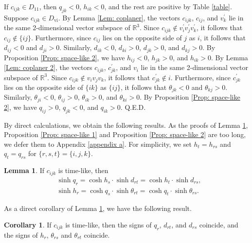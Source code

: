 \documentclass[12pt]{amsart}
\theoremstyle{definition}
\newtheorem{lemma}[theorem]{Lemma}
\newtheorem{corollary}[theorem]{Corollary}
\def\qed{\hfill{Q.E.D.}\smallskip}
\begin{document}
If $c_{ijk}\in D_{11}$, then $q_{jk}<0$, $h_{ik}<0$, and the rest are positive by Table \ref{table}.
Suppose $c_{ijk}\in D_{\mathrm{vi}}$.
By Lemma \ref{Lem: coplaner}, the vectors $c_{ijk}$, $c_{ij}$, and $v^\prime_k$ lie in the same 2-dimensional vector subspace of $\mathbb{R}^3$.
Since $c_{ijk}\notin v^\prime_iv^\prime_jv^\prime_k$,
it follows that $c_{ij}\notin \{ij\}$.
Furthermore, since $c_{ij}$ lies on the opposite side of $j$ as $i$, it follows that $d_{ij}<0$ and $d_{ji}>0$.
Similarly, $d_{ik}<0$, $d_{ki}>0$, $d_{jk}>0$, and $d_{kj}>0$.
By Proposition \ref{Prop: space-like 2},
we have $h_{ij}<0$, $h_{jk}>0$, and $h_{ik}>0$.
By Lemma \ref{Lem: coplaner 2},
the vectors $c_{ijk}$, $c^\prime_{jk}$, and $v_i$ lie in the same 2-dimensional vector subspace of $\mathbb{R}^3$.
Since $c_{ijk}\notin v_iv_jv_k$, it follows that $c^\prime_{jk}\notin i$.
Furthermore, since $c^\prime_{jk}$ lies on the opposite side of $\{ik\}$ as $\{ij\}$, it follows that $\theta_{jk}<0$ and $\theta_{kj}>0$.
Similarly, $\theta_{ji}<0$, $\theta_{ij}>0$, $\theta_{ik}>0$, and $\theta_{ki}>0$.
By Proposition \ref{Prop: space-like 2}, we have
$q_{ij}>0$, $q_{jk}<0$, and $q_{ik}>0$.
\qed

By direct calculations, we obtain the following results.
As the proofs of Lemma \ref{Lem: time-like}, Proposition \ref{Prop: space-like 1} and Proposition \ref{Prop: space-like 2} are too long, we defer them to Appendix \ref{appendix a}.
For simplicity, we set $h_t=h_{rs}$ and $q_t=q_{rs}$ for $\{r,s,t\}=\{i,j,k\}$.

\begin{lemma}\label{Lem: time-like}
If $c_{ijk}$ is time-like, then
\begin{align*}
&\sinh q_r=\cosh h_s\cdot\sinh d_{rt}=\cosh h_t\cdot\sinh d_{rs},\\
&\sinh h_r=\cosh q_s\cdot\sinh \theta_{rt}=\cosh q_t\cdot\sinh \theta_{rs}.
\end{align*}
\end{lemma}

As a direct corollary of Lemma \ref{Lem: time-like}, we have the following result.
\begin{corollary}\label{Cor: time-like}
If $c_{ijk}$ is time-like,
then the signs of $q_r$, $d_{rt}$, and $d_{rs}$ coincide, and the signs of $h_r$, $\theta_{rs}$ and $\theta_{rt}$ coincide.
\end{corollary}
\end{document}

